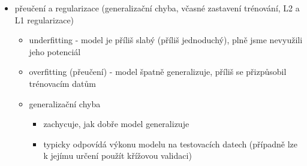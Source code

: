 \begin{itemize}
\begin{itemize}
\begin{itemize}
\item na zbylých datech model vyhodnotím
\item proces opakuju pro $n$ možných voleb
\item jako výsledné skóre modelu použiju průměr průběžných hodnocení
\end{itemize}
\item maximální věrohodnost (maximum likelihood)
\begin{itemize}
\item máme-li fixní trénovací data, pak likelihood $L(w)$ (kde $w$ jsou váhy modelu) se rovná součinu pravděpodobností targetů trénovacích dat
\item odhadujeme váhy modelu tak, aby byl likelihood (věrohodnost) trénovacích dat co největší
\item přesněji
\begin{itemize}
\item pro model s fixními vahami $w$ máme pravděpodobnostní distribuci $p_\text{model}(x;w)$, že model vygeneruje $x$
\item pro model s fixními vahami $w$ a konkrétní řádek $x$ máme pravděpodobnostní distribuci $p_\text{model}(t\mid x;w)$, jak model klasifikuje $x$
\item místo toho zafixujeme trénovací data a budeme měnit váhy $\to$ dostaneme $L(w)=p_\text{model}(X;w)=\prod_i p_\text{model}(x_i;w)$
\item $w_\text{MLE}=\text{arg max}_w\,p_\text{model}(X;w)$
\begin{itemize}
\item MLE \dots{} maximum likelihood estimation
\end{itemize}
\end{itemize}
\end{itemize}
\end{itemize}
\item přeučení a regularizace (generalizační chyba, včasné zastavení trénování, L2 a L1 regularizace)
\begin{itemize}
\item underfitting - model je příliš slabý (příliš jednoduchý), plně jsme nevyužili jeho potenciál
\item overfitting (přeučení) - model špatně generalizuje, příliš se přizpůsobil trénovacím datům
\item generalizační chyba
\begin{itemize}
\item zachycuje, jak dobře model generalizuje
\item typicky odpovídá výkonu modelu na testovacích datech (případně lze k jejímu určení použít křížovou validaci)

\end{itemize}
\end{itemize}
\end{itemize}
